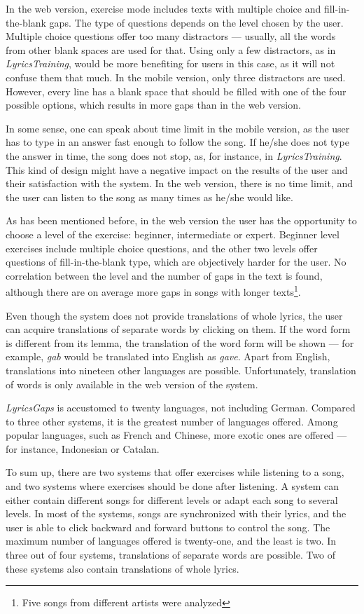 In the web version, exercise  mode includes texts with multiple choice and fill-in-the-blank gaps. The type of questions depends on the level chosen by the user. Multiple choice questions offer too many distractors --- usually, all the words from other blank spaces are used for that. Using only a few distractors, as in \textit{LyricsTraining}, would be more benefiting for users in this case, as it will not confuse them that much. In the mobile version, only three distractors are used. However, every line has a blank space that should be filled with one of the four possible options, which results in more gaps than in the web version.

In some sense, one can speak about time limit in the mobile version, as the user has to type in an answer fast enough to follow the song. If he/she does not type the answer in time, the song does not stop, as, for instance, in \textit{LyricsTraining}. This kind of design might have a negative impact on the results of the user and their satisfaction with the system. In the web version, there is no time limit, and the user can listen to the song as many times as he/she would like.

As has been mentioned before, in the web version the user has the opportunity to choose a level of the exercise: beginner, intermediate or expert. Beginner level exercises include multiple choice questions, and the other two levels offer questions of fill-in-the-blank type, which are objectively harder for the user. No correlation between the level and the number of gaps in the text is found, although there are on average more gaps in songs with longer texts\footnote{Five songs from different artists were analyzed}. 

Even though the system does not provide translations of whole lyrics, the user can acquire translations of separate words by clicking on them. If the word form is different from its lemma, the translation of the word form will be shown --- for example, \textit{gab} would be translated into English as \textit{gave}. Apart from English, translations into nineteen other languages are possible. Unfortunately, translation of words is only available in the web version of the system.

\textit{LyricsGaps} is accustomed to twenty languages, not including German. Compared to three other systems, it is the greatest number of languages offered. Among popular languages, such as French and Chinese, more exotic ones are offered --- for instance, Indonesian or Catalan.

To sum up, there are two systems that offer exercises while listening to a song, and two systems where exercises should be done after listening. A system can either contain different songs for different levels or adapt each song to several levels. In most of the systems, songs are synchronized with their lyrics, and the user is able to click backward and forward buttons to control the song. The maximum number of languages offered is twenty-one, and the least is two. In three out of four systems, translations of separate words are possible. Two of these systems also contain translations of whole lyrics.
